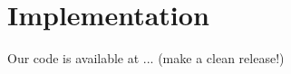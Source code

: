 \documentclass[10pt, conference, compsocconf]{IEEEtran}
\begin{document}
\section{Implementation}
\label{sec:implementation}
Our code is available at ... (make a clean release!)


\end{document}
